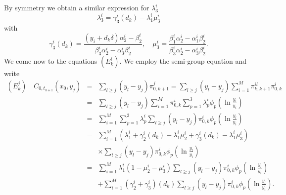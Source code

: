 \documentclass[a4paper]{article}
\begin{document}
By symmetry we obtain a similar expression for $\lambda _{3}^{i}$%
\[
\lambda _{3}^{i}=\gamma _{3}^{i}(d_{k})-\lambda _{1}^{i}\mu _{3}^{i}
\]
with
\[
\gamma _{3}^{i}(d_{k})=\frac{(y_{i}+d_{k}\delta )\alpha _{2}^{i}-\beta
_{2}^{i}}{\beta _{3}^{i}\alpha _{2}^{i}-\alpha _{3}^{i}\beta _{2}^{i}},\quad
\mu _{3}^{i}=\frac{\beta _{1}^{i}\alpha _{2}^{i}-\alpha _{1}^{i}\beta
_{2}^{i}}{\beta _{3}^{i}\alpha _{2}^{i}-\alpha _{3}^{i}\beta _{2}^{i}}.
\]
We come now to the equations $(E_{k}^{i}).$ We employ the semi-group equation
and write
\begin{eqnarray*}
(E_{k}^{j})\quad C_{0,t_{k+1}}(x_{0},y_{j}) &=&\sum_{l\geq
j}(y_{l}-y_{j})\pi _{0,k+1}^{j}=\sum_{l\geq j}(y_{l}-y_{j})\sum_{i=1}^{M}\pi
_{k,k+1}^{il}\pi _{0,k}^{i} \\
&=&\sum_{l\geq j}(y_{l}-y_{j})\sum_{i=1}^{M}\pi
_{0,k}^{i}\sum_{p=1}^{3}\lambda _{p}^{i}\phi _{p}(\ln \frac{y_{l}}{y_{i}}) \\
&=&\sum_{i=1}^{M}\sum_{p=1}^{3}\lambda _{p}^{i}\sum_{l\geq
j}(y_{l}-y_{j})\pi _{0,k}^{i}\phi _{p}(\ln \frac{y_{l}}{y_{i}}) \\
&=&\sum_{i=1}^{M}(\lambda _{1}^{i}+\gamma _{2}^{i}(d_{k})-\lambda
_{1}^{i}\mu _{2}^{i}+\gamma _{3}^{i}(d_{k})-\lambda _{1}^{i}\mu
_{3}^{i})\\ &&\times\sum_{l\geq j}(y_{l}-y_{j})\pi _{0,k}^{i}\phi _{p}(\ln \frac{y_{l}}{
y_{i}}) \\
&=&\sum_{i=1}^{M}\lambda _{1}^{i}(1-\mu _{2}^{i}-\mu _{3}^{i})\sum_{l\geq
j}(y_{l}-y_{j})\pi _{0,k}^{i}\phi _{p}(\ln \frac{y_{l}}{y_{i}}) \\
&&+\sum_{i=1}^{M}(\gamma _{2}^{i}+\gamma _{3}^{i})(d_{k})\sum_{l\geq
j}(y_{l}-y_{j})\pi _{0,k}^{i}\phi _{p}(\ln \frac{y_{l}}{y_{i}}).
\end{eqnarray*}
\end{document}
